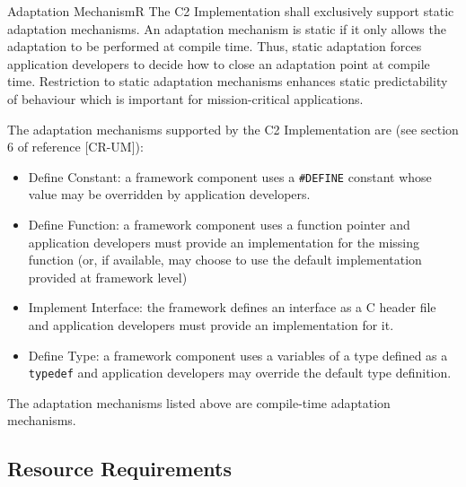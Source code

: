 \documentclass{pnp_article}
\begin{document}
\begin{fwReqNote}{Adaptation Mechanism}{R}
{The C2 Implementation shall exclusively support static adaptation mechanisms.}
{An adaptation mechanism is static if it only allows the adaptation to be performed at compile time. Thus, static adaptation forces application developers to decide how to close an adaptation point at compile time.}
{Restriction to static adaptation mechanisms enhances static predictability of behaviour which is important for mission-critical applications.}
{The adaptation mechanisms supported by the C2 Implementation are (see section 6 of reference [CR-UM]):

\begin{itemize}
\item Define Constant: a framework component uses a \texttt{\#DEFINE} constant whose value may be overridden by application developers.
\item Define Function: a framework component uses a function pointer and application developers must provide an implementation for the missing function (or, if available, may choose to use the default implementation provided at framework level)
\item Implement Interface: the framework defines an interface as a C header file and application developers must provide an implementation for it.
\item Define Type: a framework component uses a variables of a type defined as a \texttt{typedef} and application developers may override the default type definition.
\end{itemize} } 
{The adaptation mechanisms listed above are compile-time adaptation mechanisms.}
\end{fwReqNote}


\subsection{Resource Requirements}\label{req:resourceReqs}
\end{document}
